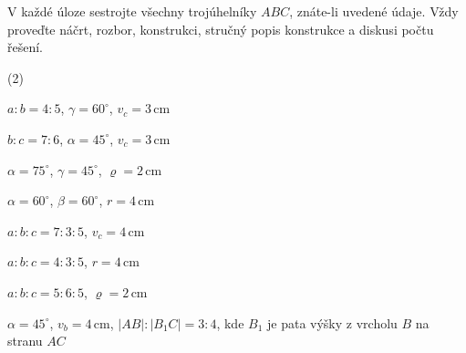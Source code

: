 \documentclass[12pt,a4paper]{article}
\begin{document}

\setcounter{section}{5}

\begin{exercise}

    V každé úloze sestrojte všechny trojúhelníky $ABC$, znáte-li uvedené údaje.
    Vždy proveďte náčrt, rozbor, konstrukci, stručný popis konstrukce a diskusi počtu řešení.

    \begin{tasks}(2)

        \task $a:b=4:5$, $\gamma=60^\circ$, $v_c=3\,\mathrm{cm}$

        \task $b:c=7:6$, $\alpha=45^\circ$, $v_c=3\,\mathrm{cm}$

        \task $\alpha=75^\circ$, $\gamma=45^\circ$, $\varrho=2\,\mathrm{cm}$

        \task $\alpha=60^\circ$, $\beta=60^\circ$, $r=4\,\mathrm{cm}$

        \task $a:b:c=7:3:5$, $v_c=4\,\mathrm{cm}$

        \task $a:b:c=4:3:5$, $r=4\,\mathrm{cm}$

        \task $a:b:c=5:6:5$, $\varrho=2\,\mathrm{cm}$

        \task $\alpha=45^\circ$, $v_b=4\,\mathrm{cm}$, $|AB|:|B_1C|=3:4$, kde $B_1$ je pata výšky z vrcholu $B$ na stranu $AC$

    \end{tasks}

\end{exercise}



\setcounter{section}{6}
\end{document}
